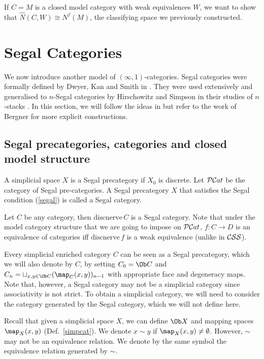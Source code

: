 If $C=M$ is a closed model category with weak equivalences $W$, we want to show that $\hat N(C,W)\cong N^f(M)$, the classifying space we previously constructed.


\section{Segal Categories}
We now introduce another model of $(\infty,1)$-categories. Segal categories were formally defined by Dwyer, Kan and Smith in \cite{dks}. They were used extensively and generalised to $n$-Segal categories by Hirschowitz and Simpson in their studies of $n$-stacks \cite{hs}. In this section, we will follow the ideas in \cite{hs} but refer to the work of Bergner \cite{bergner2} for more explicit constructions. 

\subsection{Segal precategories, categories and closed model structure}
\begin{defin}
A simplicial space $X$ is a Segal precategory if $X_0$ is discrete. Let ${\cal PC}at$ be the category of Segal pre-categories. A Segal precategory $X$ that satisfies the Segal condition (\ref{segal}) is called a Segal category.
\end{defin}

\begin{eg}
Let $C$ be any category, then $\mathrm{discnerve}\,C$ is a Segal category. Note that under the model category structure that we are going to impose on ${\cal PC}at$, $f:C\to D$ is an equivalence of categories iff $\mathrm{discnerve}\,f$ is a weak equivalence (unlike in ${\cal CSS}$).
\end{eg}

Every simplicial enriched category $C$ can be seen as a Segal precategory, which we will also denote by $C$, by setting $C_0=\Ob C$ and $C_n=\sqcup_{x,y\in\Ob C}(\map_C(x,y))_{n-1}$ with appropriate face and degeneracy maps. Note that, however, a Segal category may not be a simplicial category since associativity is not strict. To obtain a simplicial category, we will need to consider the category generated by the Segal category, which we will not define here.

Recall that given a simplicial space $X$, we can define $\Ob X$ and mapping spaces $\map_X(x,y)$ (Def.~\ref{simpcat}). We denote $x\sim y$ if $\map_X(x,y)\ne\emptyset$. However, $\sim$ may not be an equivalence relation. We denote by the same symbol the equivalence relation generated by $\sim$.

